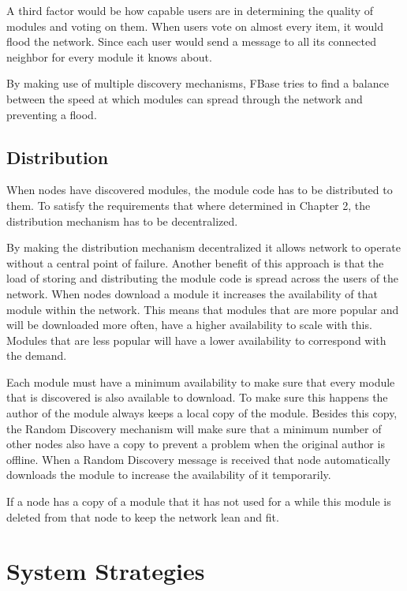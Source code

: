 A third factor would be how capable users are in determining the quality of modules and voting on them. When users vote on almost every item, it would flood the network. Since each user would send a message to all its connected neighbor for every module it knows about. 

By making use of multiple discovery mechanisms, FBase tries to find a balance between the speed at which modules can spread through the network and preventing a flood.

\subsection{Distribution}

When nodes have discovered modules, the module code has to be distributed to them. To satisfy the requirements that where determined in Chapter 2, the distribution mechanism has to be decentralized.

By making the distribution mechanism decentralized it allows network to operate without a central point of failure. Another benefit of this approach is that the load of storing and distributing the module code is spread across the users of the network. When nodes download a module it increases the availability of that module within the network. This means that modules that are more popular and will be downloaded more often, have a higher availability to scale with this. Modules that are less popular will have a lower availability to correspond with the demand.

Each module must have a minimum availability to make sure that every module that is discovered is also available to download. To make sure this happens the author of the module always keeps a local copy of the module. Besides this copy, the Random Discovery mechanism will make sure that a minimum number of other nodes also have a copy to prevent a problem when the original author is offline. When a Random Discovery message is received that node automatically downloads the module to increase the availability of it temporarily.

If a node has a copy of a module that it has not used for a while this module is deleted from that node to keep the network lean and fit.

\section{System Strategies}

